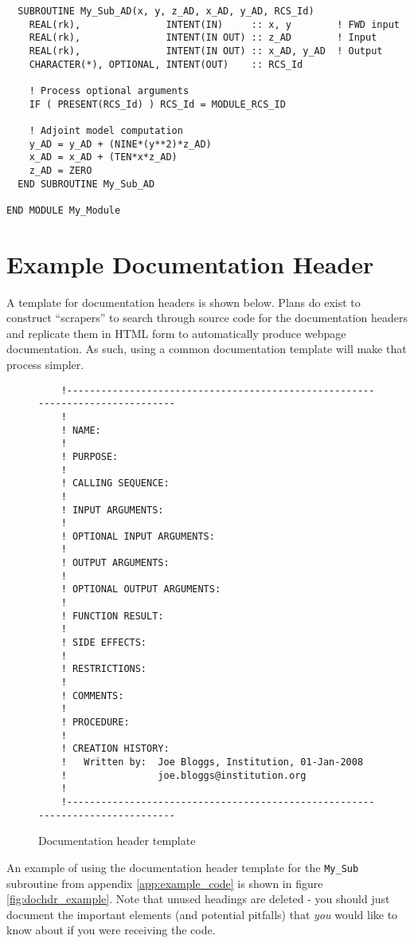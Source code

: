 \begin{appendix}
\begin{verbatim}
  SUBROUTINE My_Sub_AD(x, y, z_AD, x_AD, y_AD, RCS_Id)
    REAL(rk),               INTENT(IN)     :: x, y        ! FWD input
    REAL(rk),               INTENT(IN OUT) :: z_AD        ! Input
    REAL(rk),               INTENT(IN OUT) :: x_AD, y_AD  ! Output
    CHARACTER(*), OPTIONAL, INTENT(OUT)    :: RCS_Id

    ! Process optional arguments
    IF ( PRESENT(RCS_Id) ) RCS_Id = MODULE_RCS_ID

    ! Adjoint model computation
    y_AD = y_AD + (NINE*(y**2)*z_AD)
    x_AD = x_AD + (TEN*x*z_AD)
    z_AD = ZERO
  END SUBROUTINE My_Sub_AD

END MODULE My_Module
\end{verbatim}


\newpage
\section{Example Documentation Header}
A template for documentation headers is shown below. Plans do exist to construct ``scrapers'' to search through source code for the documentation headers and replicate them in HTML form to automatically produce webpage documentation. As such, using a common documentation template will make that process simpler.
\begin{figure}[htp]
  \centering
  \begin{verbatim}
    !------------------------------------------------------------------------------
    !
    ! NAME:
    !
    ! PURPOSE:
    !
    ! CALLING SEQUENCE:
    !
    ! INPUT ARGUMENTS:
    !
    ! OPTIONAL INPUT ARGUMENTS:
    !
    ! OUTPUT ARGUMENTS:
    !
    ! OPTIONAL OUTPUT ARGUMENTS:
    !
    ! FUNCTION RESULT:
    !
    ! SIDE EFFECTS:
    !
    ! RESTRICTIONS:
    !
    ! COMMENTS:
    !
    ! PROCEDURE:
    !
    ! CREATION HISTORY:
    !   Written by:  Joe Bloggs, Institution, 01-Jan-2008
    !                joe.bloggs@institution.org
    !
    !------------------------------------------------------------------------------\end{verbatim}
  \caption{Documentation header template}
\end{figure}

An example of using the documentation header template for the \texttt{My\_Sub} subroutine from appendix \ref{app:example_code} is shown in figure \ref{fig:dochdr_example}. Note that unused headings are deleted - you should just document the important elements (and potential pitfalls) that \emph{you} would like to know about if you were receiving the code.


\end{appendix}
